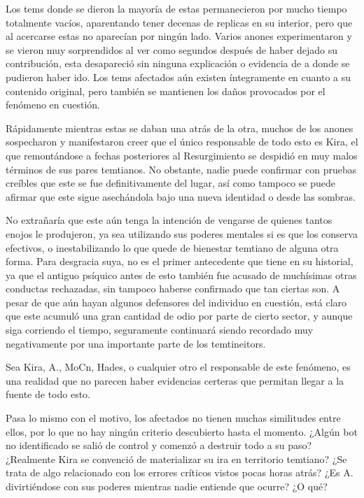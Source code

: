 \documentclass[
]{book}
\begin{document}
Los tems donde se dieron la mayoría de estas permanecieron por mucho tiempo totalmente vacíos, aparentando tener decenas de replicas en su interior, pero que al acercarse estas no aparecían por ningún lado. Varios anones experimentaron y se vieron muy sorprendidos al ver como segundos después de haber dejado su contribución, esta desapareció sin ninguna explicación o evidencia de a donde se pudieron haber ido. Los tems afectados aún existen íntegramente en cuanto a su contenido original, pero también se mantienen los daños provocados por el fenómeno en cuestión.

Rápidamente mientras estas se daban una atrás de la otra, muchos de los anones sospecharon y manifestaron creer que el único responsable de todo esto es Kira, el que remontándose a fechas posteriores al Resurgimiento se despidió en muy malos términos de sus pares temtianos. No obstante, nadie puede confirmar con pruebas creíbles que este se fue definitivamente del lugar, así como tampoco se puede afirmar que este sigue asechándola bajo una nueva identidad o desde las sombras.

No extrañaría que este aún tenga la intención de vengarse de quienes tantos enojos le produjeron, ya sea utilizando sus poderes mentales si es que los conserva efectivos, o inestabilizando lo que quede de bienestar temtiano de alguna otra forma. Para desgracia suya, no es el primer antecedente que tiene en su historial, ya que el antiguo psíquico antes de esto también fue acusado de muchísimas otras conductas rechazadas, sin tampoco haberse confirmado que tan ciertas son. A pesar de que aún hayan algunos defensores del individuo en cuestión, está claro que este acumuló una gran cantidad de odio por parte de cierto sector, y aunque siga corriendo el tiempo, seguramente continuará siendo recordado muy negativamente por una importante parte de los temtineitors.

Sea Kira, A., MoCn, Hades, o cualquier otro el responsable de este fenómeno, es una realidad que no parecen haber evidencias certeras que permitan llegar a la fuente de todo esto.

Pasa lo mismo con el motivo, los afectados no tienen muchas similitudes entre ellos, por lo que no hay ningún criterio descubierto hasta el momento. ¿Algún bot no identificado se salió de control y comenzó a destruir todo a su paso? ¿Realmente Kira se convenció de materializar su ira en territorio temtiano? ¿Se trata de algo relacionado con los errores críticos vistos pocas horas atrás? ¿Es A. divirtiéndose con sus poderes mientras nadie entiende que ocurre? ¿O qué?
\end{document}
